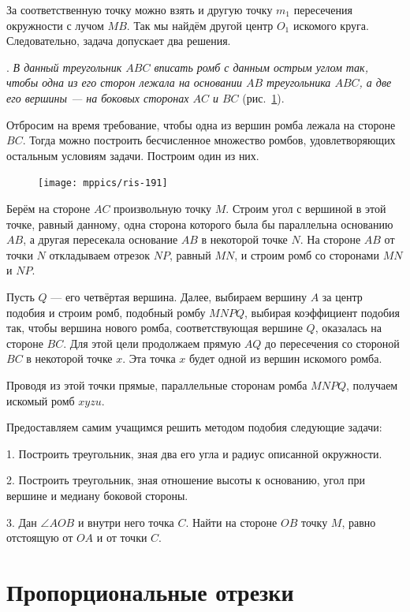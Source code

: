 \documentclass[twoside]{book}
\begin{document}
За соответственную точку можно взять и другую точку $m_1$ пересечения окружности с лучом $MB$.
Так мы найдём другой центр $O_1$ искомого круга.
Следовательно, задача допускает два решения.

\medskip

\smallskip
{}.
\emph{В данный треугольник $ABC$ вписать ромб с данным острым углом так, чтобы одна из его сторон лежала на основании $AB$ треугольника $ABC$, а две его вершины — на боковых сторонах $AC$ и $BC$} (рис.~\ref{1938/ris-191}).

Отбросим на время требование, чтобы одна из вершин ромба лежала на стороне $BC$.
Тогда можно построить бесчисленное множество ромбов, удовлетворяющих остальным условиям задачи.
Построим один из них.

\begin{figure}
\centering
\texttt{[image: mppics/ris-191]}
\caption{}\label{1938/ris-191}
\end{figure}

Берём на стороне $AC$ произвольную точку $M$.
Строим угол с вершиной в этой точке, равный данному, одна сторона которого была бы параллельна основанию $AB$, а другая пересекала основание $AB$ в некоторой точке $N$.
На стороне $AB$ от точки $N$ откладываем отрезок $NP$, равный $MN$, и строим ромб со сторонами $MN$ и $NP$.

Пусть $Q$ — его четвёртая вершина.
Далее, выбираем вершину $A$ за центр подобия и строим ромб, подобный ромбу $MNPQ$, выбирая коэффициент подобия так, чтобы вершина нового ромба, соответствующая вершине $Q$, оказалась на стороне $BC$.
Для этой цели продолжаем прямую $AQ$ до пересечения со стороной $BC$ в некоторой точке $x$.
Эта точка $x$ будет одной из вершин искомого ромба.

Проводя из этой точки прямые, параллельные сторонам ромба $MNPQ$, получаем искомый ромб $xyzu$.

Предоставляем самим учащимся решить методом подобия следующие задачи:

1.
Построить треугольник, зная два его угла и радиус описанной окружности.

2.
Построить треугольник, зная отношение высоты к основанию, угол при вершине и медиану боковой стороны.

3.
Дан $\angle AOB$ и внутри него точка $C$.
Найти на стороне $OB$ точку $M$, равно отстоящую от $OA$ и от точки $C$.

\section{Пропорциональные отрезки} 
\end{document}
